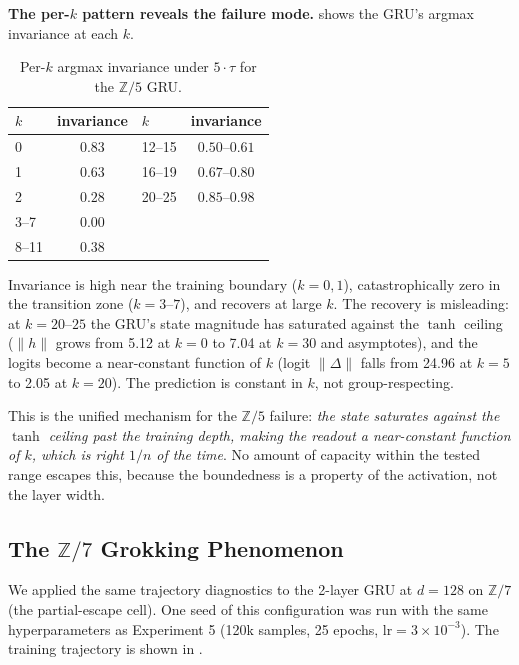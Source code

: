 \documentclass[11pt]{article}
\theoremstyle{definition}
\newcommand{\Z}{\mathbb{Z}}
\begin{document}
\textbf{The per-$k$ pattern reveals the failure mode.}
 shows the GRU's argmax invariance at each $k$.

\begin{table}[h]
\centering
\caption{Per-$k$ argmax invariance under $5\cdot\tau$ for the
$\Z/5$ GRU.}
\label{tab:gru-perk}
\begin{tabular}{lc|lc}
\toprule
$k$ & invariance & $k$ & invariance \\
\midrule
0   & $0.83$ & 12--15 & $0.50$--$0.61$ \\
1   & $0.63$ & 16--19 & $0.67$--$0.80$ \\
2   & $0.28$ & 20--25 & $0.85$--$0.98$ \\
3--7 & $\mathbf{0.00}$ & & \\
8--11 & $0.38$ & & \\
\bottomrule
\end{tabular}
\end{table}

Invariance is high near the training boundary ($k=0, 1$),
catastrophically zero in the transition zone ($k=3$--$7$), and
recovers at large $k$. The recovery is misleading: at $k=20$--$25$
the GRU's state magnitude has saturated against the $\tanh$ ceiling
($\|h\|$ grows from 5.12 at $k=0$ to 7.04 at $k=30$ and asymptotes),
and the logits become a near-constant function of $k$ (logit
$\|\Delta\|$ falls from 24.96 at $k=5$ to 2.05 at $k=20$). The
prediction is constant in $k$, not group-respecting.

This is the unified mechanism for the $\Z/5$ failure: \emph{the
state saturates against the $\tanh$ ceiling past the training depth,
making the readout a near-constant function of $k$, which is right
$1/n$ of the time}. No amount of capacity within the tested range
escapes this, because the boundedness is a property of the
activation, not the layer width.

\subsection{The $\Z/7$ Grokking Phenomenon}

We applied the same trajectory diagnostics to the 2-layer GRU at
$d=128$ on $\Z/7$ (the partial-escape cell). One seed of this
configuration was run with the same hyperparameters as Experiment 5
(120k samples, 25 epochs, $\mathrm{lr}=3\times 10^{-3}$). The
training trajectory is shown in .
\end{document}
